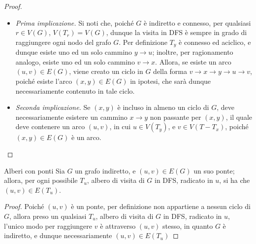 \documentclass[a4paper, 12pt]{report}
\begin{document}
    \begin{proof}
        \hspace{0.7cm}
        \begin{itemize}
            \item[] \textit{Prima implicazione.} Si noti che, poiché $G$ è indiretto e connesso, per qualsiasi $r \in V(G)$, $V(T_r) = V(G)$, dunque la visita in DFS è sempre in grado di raggiungere ogni nodo del grafo $G$.
                Per definizione $T_y$ è connesso ed aciclico, e dunque esiste uno ed un solo cammino $y \rightarrow u$; inoltre, per ragionamento analogo, esiste uno ed un solo cammino $v \rightarrow x$. Allora, se esiste un arco $(u, v) \in E(G)$, viene creato un ciclo in $G$ della forma $v \rightarrow x \rightarrow y \rightarrow u \rightarrow v$, poiché esiste l'arco $(x, y) \in E(G)$ in ipotesi, che sarà dunque necessariamente contenuto in tale ciclo.
            \item[] \textit{Seconda implicazione.}  Se $(x, y)$ è incluso in almeno un ciclo di $G$, deve necessariamente esistere un cammino $x \rightarrow y$ non passante per $(x, y)$, il quale deve contenere un arco $(u, v)$, in cui $u \in V(T_y)$, e $v \in V(T - T_x)$, poiché $(x, y) \in E(G)$ è un arco.

        \end{itemize}
    \end{proof}

    \begin{framedlem}{Alberi con ponti}
        Sia $G$ un grafo indiretto, e $(u, v) \in E(G)$ un suo ponte; allora, per ogni possibile $T_u$, albero di visita di $G$ in DFS, radicato in $u$, si ha che $(u, v) \in E(T_u)$.
    \end{framedlem}

    \begin{proof}
        Poiché $(u, v)$ è un ponte, per definizione non appartiene a nessun ciclo di $G$, allora preso un qualsiasi $T_u$, albero di visita di $G$ in DFS, radicato in $u$, l'unico modo per raggiungere $v$ è attraverso $(u, v)$ stesso, in quanto $G$ è indiretto, e dunque necessariamente $(u, v) \in E(T_u)$
    \end{proof}
\end{document}
